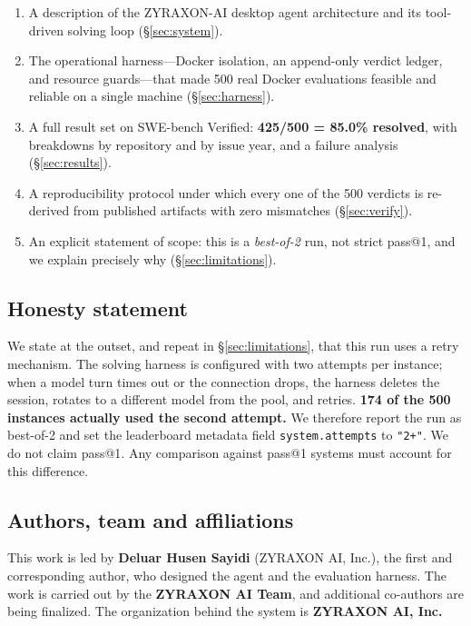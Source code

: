 \documentclass[11pt,a4paper]{article}
\begin{document}
\begin{enumerate}[leftmargin=1.4em]
  \item A description of the ZYRAXON-AI desktop agent architecture and its tool-driven
  solving loop (\S\ref{sec:system}).
  \item The operational harness---Docker isolation, an append-only verdict ledger, and
  resource guards---that made 500 real Docker evaluations feasible and reliable on a
  single machine (\S\ref{sec:harness}).
  \item A full result set on SWE-bench Verified: \textbf{425/500 = 85.0\% resolved},
  with breakdowns by repository and by issue year, and a failure analysis
  (\S\ref{sec:results}).
  \item A reproducibility protocol under which every one of the 500 verdicts is
  re-derived from published artifacts with zero mismatches (\S\ref{sec:verify}).
  \item An explicit statement of scope: this is a \emph{best-of-2} run, not strict
  pass@1, and we explain precisely why (\S\ref{sec:limitations}).
\end{enumerate}

\subsection{Honesty statement}

We state at the outset, and repeat in \S\ref{sec:limitations}, that this run uses a
retry mechanism. The solving harness is configured with two attempts per instance; when
a model turn times out or the connection drops, the harness deletes the session, rotates
to a different model from the pool, and retries. \textbf{174 of the 500 instances
actually used the second attempt.} We therefore report the run as best-of-2 and set the
leaderboard metadata field \texttt{system.attempts} to \texttt{"2+"}. We do not claim
pass@1. Any comparison against pass@1 systems must account for this difference.

\subsection{Authors, team and affiliations}

This work is led by \textbf{Deluar Husen Sayidi} (ZYRAXON AI, Inc.), the first and
corresponding author, who designed the agent and the evaluation harness. The work is
carried out by the \textbf{ZYRAXON AI Team}, and additional co-authors are being
finalized. The organization behind the system is \textbf{ZYRAXON AI, Inc.}
\end{document}
